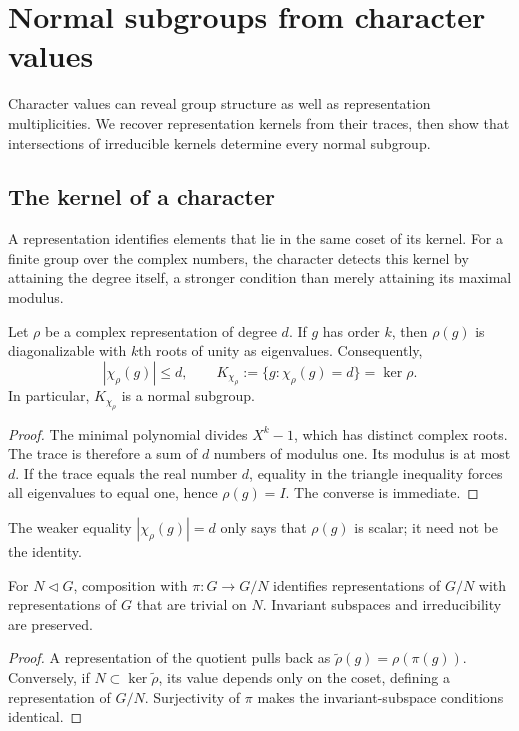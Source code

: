 \section{Normal subgroups from character values}

Character values can reveal group structure as well as representation
multiplicities. We recover representation kernels from their traces, then
show that intersections of irreducible kernels determine every normal
subgroup.

\subsection{The kernel of a character}

A representation identifies elements that lie in the same coset of its
kernel. For a finite group over the complex numbers, the character detects
this kernel by attaining the degree itself, a stronger condition than merely
attaining its maximal modulus.

\begin{prop}
\label{kernel-prop-characters}
Let $\rho$ be a complex representation of degree $d$. If $g$ has order
$k$, then $\rho(g)$ is diagonalizable with $k$th roots of unity as
eigenvalues. Consequently,
\[
 |\chi_\rho(g)|\leq d,\qquad
 K_{\chi_\rho}:=\{g:\chi_\rho(g)=d\}=\ker\rho.
\]
In particular, $K_{\chi_\rho}$ is a normal subgroup.
\end{prop}
\begin{proof}
The minimal polynomial divides $X^k-1$, which has distinct complex roots.
The trace is therefore a sum of $d$ numbers of modulus one. Its modulus
is at most $d$. If the trace equals the real number $d$, equality in
the triangle inequality forces all eigenvalues to equal one, hence
$\rho(g)=I$. The converse is immediate.
\end{proof}
The weaker equality $|\chi_\rho(g)|=d$ only says that $\rho(g)$ is scalar;
it need not be the identity.


\begin{lem}
\label{lem-extension-repr-grpe-distignue}
For $N\lhd G$, composition with $\pi:G\to G/N$ identifies representations
of $G/N$ with representations of $G$ that are trivial on $N$. Invariant
subspaces and irreducibility are preserved.
\end{lem}
\begin{proof}
A representation of the quotient pulls back as $\widetilde\rho(g)=\rho(\pi(g))$.
Conversely, if $N\subset\ker\widetilde\rho$, its value depends only on
the coset, defining a representation of $G/N$. Surjectivity of $\pi$
makes the invariant-subspace conditions identical.
\end{proof}

